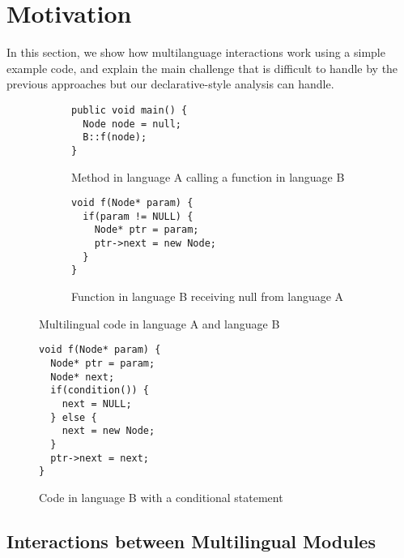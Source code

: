 \section{Motivation}
In this section, we show how multilanguage interactions work using a
simple example code, and explain the main challenge that is difficult to handle
by the previous approaches but our declarative-style analysis can handle.

\begin{figure}[t]
  \centering
  \vspace{2mm}
  \begin{subfigure}[t]{0.5\textwidth}
    \begin{lstlisting}[style=java,xleftmargin=2.5em]
public void main() {
  Node node = null;
  B::f(node);
}
    \end{lstlisting}
    \vspace*{-.5em}
    \caption{Method in language A calling a function in language B}
    \label{fig:exam1:langA}
  \end{subfigure}
  \begin{subfigure}[t]{0.5\textwidth}
    \begin{lstlisting}[style=cpp,firstnumber=5,xleftmargin=2.5em]
void f(Node* param) {
  if(param != NULL) {
    Node* ptr = param;
    ptr->next = new Node;
  }
}
    \end{lstlisting}
    \vspace*{-.5em}
    \caption{Function in language B receiving null from language A}
    \label{fig:exam1:langB}
  \end{subfigure}
  \vspace*{-.5em}
  \caption{Multilingual code in language A and language B}
  \label{fig:exam1}
\end{figure}

\begin{figure}[t]
  \centering
  \vspace{2mm}
  \begin{lstlisting}[style=cpp,firstnumber=5,xleftmargin=2.5em]
void f(Node* param) {
  Node* ptr = param;
  Node* next;
  if(condition()) {
    next = NULL;
  } else {
    next = new Node;
  }
  ptr->next = next;
}
  \end{lstlisting}
  \vspace*{-.5em}
  \caption{Code in language B with a conditional statement}
  \label{fig:exam2}
\end{figure}

\subsection{Interactions between Multilingual Modules}

